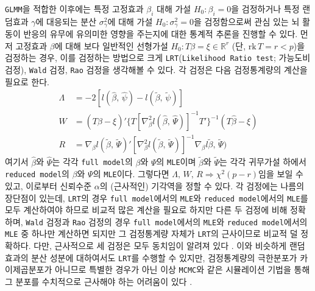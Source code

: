 \documentclass[10pt,onecolumn,twoside,a4size]{gsag3jnl}
\begin{document}
\texttt{GLMM}을 적합한 이후에는 특정 고정효과 $\beta_i$ 대해 가설 $H_0:\beta_i=0$을 검정하거나 특정 랜덤효과 $\gamma$에 대응되는 분산 $\sigma_\gamma^2$에 대해 가설 $H_0:\sigma^2_\gamma=0$을 검정함으로써 관심 있는 뇌 활동이 반응의 유무에 유의미한 영향을 주는지에 대한 통계적 추론을 진행할 수 있다. 먼저 고정효과 $\beta$에 대해 보다 일반적인 선형가설 $H_0:T\beta=\xi\in\mathbb{R}^r$ (단, $\mathrm{rk}\,T=r<p$)을 검정하는 경우, 이를 검정하는 방법으로 크게 \texttt{LRT}(\texttt{Likelihood Ratio test}; 가능도비 검정), \texttt{Wald} 검정, \texttt{Rao} 검정을 생각해볼 수 있다. 각 검정은 다음 검정통계량의 계산을 필요로 한다.
\begin{align}
  \Lambda&=-2[l(\widehat{\beta},\,\widehat{\psi})-l(\widetilde{\beta},\,\widetilde{\psi})]\\
  W&=(T\widehat{\beta}-\xi)'\{T[\nabla^2_\beta l(\widehat{\beta},\,\widehat{\Psi})]^{-1}T'\}^{-1}(T\widehat{\beta}-\xi)\\
  R&=\nabla_\beta l(\widetilde{\beta},\,\widetilde{\Psi})'[\nabla^2_\beta l(\widetilde{\beta},\,\widetilde{\Psi})]^{-1}\nabla_\beta l\widetilde{\beta},\,\widetilde{\Psi})
\end{align}
여기서 $\widehat{\beta}$와 $\widehat{\Psi}$는 각각 \texttt{full model}의 $\beta$와 $\Psi$의 \texttt{MLE}이며 $\widetilde{\beta}$와 $\widetilde{\Psi}$는 각각 귀무가설 하에서 \texttt{reduced model}의 $\beta$와 $\Psi$의 \texttt{MLE}이다. 그렇다면 $\Lambda,\,W,\,R\Rightarrow\chi^2(p-r)$임을 보일 수 있고, 이로부터 신뢰수준 $\alpha$의 (근사적인) 기각역을 정할 수 있다. 각 검정에는 나름의 장단점이 있는데, \texttt{LRT}의 경우 \texttt{full model}에서의 \texttt{MLE}와 \texttt{reduced model}에서의 \texttt{MLE}를 모두 계산하여야 하므로 비교적 많은 계산을 필요로 하지만 다른 두 검정에 비해 정확하며, \texttt{Wald} 검정과 \texttt{Rao} 검정의 경우 \texttt{full model}에서의 \texttt{MLE}와 \texttt{reduced model}에서의 \texttt{MLE} 중 하나만 계산하면 되지만 그 검정통계량 자체가 \texttt{LRT}의 근사이므로 비교적 덜 정확하다. 다만, 근사적으로 세 검정은 모두 동치임이 알려져 있다 \texttt{\citep{tuerlinckx2006statistical}}. 이와 비슷하게 랜덤효과의 분산 성분에 대하여서도 \texttt{LRT}를 수행할 수 있지만, 검정통계량의 극한분포가 카이제곱분포가 아니므로 특별한 경우가 아닌 이상 \texttt{MCMC}와 같은 시뮬레이션 기법을 통해 그 분포를 수치적으로 근사해야 하는 어려움이 있다 \texttt{\citep{zhang2008variance}}.
\end{document}
